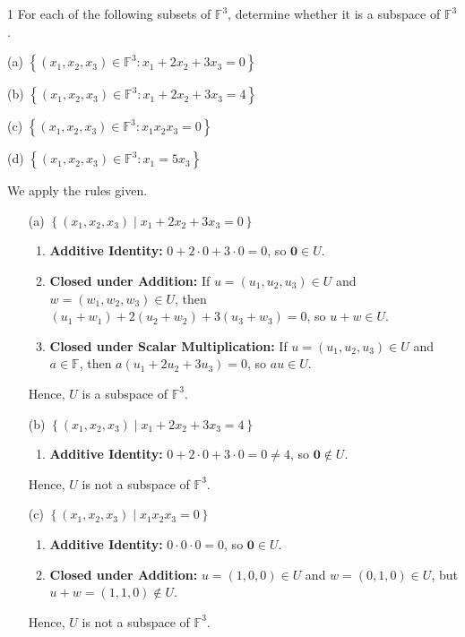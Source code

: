 \begin{exercise}
1 For each of the following subsets of $\mathbb{F}^{3}$, determine whether it is a subspace of $\mathbb{F}^{3}$.

(a) $\left\{\left(x_{1}, x_{2}, x_{3}\right) \in \mathbb{F}^{3}: x_{1}+2 x_{2}+3 x_{3}=0\right\}$

(b) $\left\{\left(x_{1}, x_{2}, x_{3}\right) \in \mathbb{F}^{3}: x_{1}+2 x_{2}+3 x_{3}=4\right\}$

(c) $\left\{\left(x_{1}, x_{2}, x_{3}\right) \in \mathbb{F}^{3}: x_{1} x_{2} x_{3}=0\right\}$

(d) $\left\{\left(x_{1}, x_{2}, x_{3}\right) \in \mathbb{F}^{3}: x_{1}=5 x_{3}\right\}$
\end{exercise}
\begin{solution}
We apply the rules given.
\begin{enumerate}
    \item[(a)] \(\left\{ \left( x_{1}, x_{2}, x_{3} \right) \mid x_{1} + 2x_{2} + 3x_{3} = 0 \right\}\)
    \begin{enumerate}
        \item \textbf{Additive Identity:} \(0 + 2 \cdot 0 + 3 \cdot 0 = 0\), so \( \mathbf{0} \in U \).
        \item \textbf{Closed under Addition:} If \(u = (u_{1}, u_{2}, u_{3}) \in U\) and \(w = (w_{1}, w_{2}, w_{3}) \in U\), then \((u_{1} + w_{1}) + 2(u_{2} + w_{2}) + 3(u_{3} + w_{3}) = 0\), so \(u + w \in U\).
        \item \textbf{Closed under Scalar Multiplication:} If \(u = (u_{1}, u_{2}, u_{3}) \in U\) and \(a \in \mathbb{F}\), then \(a(u_{1} + 2u_{2} + 3u_{3}) = 0\), so \(au \in U\).
    \end{enumerate}
    Hence, \( U \) is a subspace of \(\mathbb{F}^{3}\).

    \item[(b)] \(\left\{ \left( x_{1}, x_{2}, x_{3} \right) \mid x_{1} + 2x_{2} + 3x_{3} = 4 \right\}\)
    \begin{enumerate}
        \item \textbf{Additive Identity:} \(0 + 2 \cdot 0 + 3 \cdot 0 = 0 \neq 4\), so \( \mathbf{0} \notin U \).
    \end{enumerate}
    Hence, \( U \) is not a subspace of \(\mathbb{F}^{3}\).

    \item[(c)] \(\left\{ \left( x_{1}, x_{2}, x_{3} \right) \mid x_{1} x_{2} x_{3} = 0 \right\}\)
    \begin{enumerate}
        \item \textbf{Additive Identity:} \(0 \cdot 0 \cdot 0 = 0\), so \( \mathbf{0} \in U \).
        \item \textbf{Closed under Addition:} \(u = (1, 0, 0) \in U\) and \(w = (0, 1, 0) \in U\), but \(u + w = (1, 1, 0) \notin U\).
    \end{enumerate}
    Hence, \( U \) is not a subspace of \(\mathbb{F}^{3}\).


\end{enumerate}
\end{solution}
